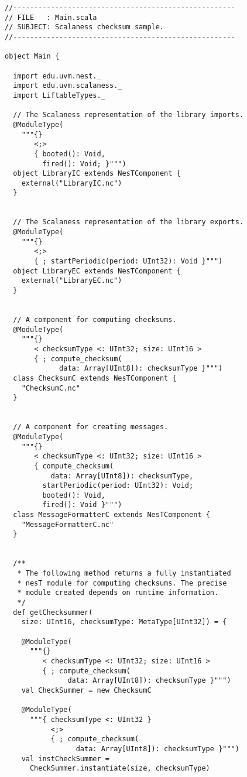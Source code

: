 \singlespace
\vspace{1.0ex}
\begin{lstlisting}[language=scalaness]
//-----------------------------------------------------
// FILE   : Main.scala
// SUBJECT: Scalaness checksum sample.
//-----------------------------------------------------

object Main {

  import edu.uvm.nest._
  import edu.uvm.scalaness._
  import LiftableTypes._ 

  // The Scalaness representation of the library imports.
  @ModuleType(
    """{}
       <;>
       { booted(): Void,
         fired(): Void; }""")
  object LibraryIC extends NesTComponent {
    external("LibraryIC.nc")
  }


  // The Scalaness representation of the library exports.
  @ModuleType(
    """{}
       <;>
       { ; startPeriodic(period: UInt32): Void }""")
  object LibraryEC extends NesTComponent {
    external("LibraryEC.nc")
  }


  // A component for computing checksums.
  @ModuleType(
    """{}
       < checksumType <: UInt32; size: UInt16 >
       { ; compute_checksum(
             data: Array[UInt8]): checksumType }""")
  class ChecksumC extends NesTComponent {
    "ChecksumC.nc"
  }
 

  // A component for creating messages.
  @ModuleType(
    """{}
       < checksumType <: UInt32; size: UInt16 >
       { compute_checksum(
           data: Array[UInt8]): checksumType,
         startPeriodic(period: UInt32): Void;
         booted(): Void,
         fired(): Void }""")
  class MessageFormatterC extends NesTComponent {
    "MessageFormatterC.nc"
  }


  /**
   * The following method returns a fully instantiated
   * nesT module for computing checksums. The precise
   * module created depends on runtime information.
   */
  def getChecksummer(
    size: UInt16, checksumType: MetaType[UInt32]) = {
  
    @ModuleType(
      """{}
         < checksumType <: UInt32; size: UInt16 >
         { ; compute_checksum(
               data: Array[UInt8]): checksumType }""")
    val CheckSummer = new ChecksumC
    
    @ModuleType(
      """{ checksumType <: UInt32 }
           <;>
           { ; compute_checksum(
                 data: Array[UInt8]): checksumType }""")
    val instCheckSummer =
      CheckSummer.instantiate(size, checksumType)
    

\end{lstlisting}
